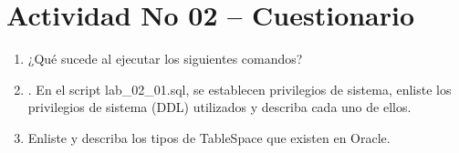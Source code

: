 \section{Actividad No 02 – Cuestionario} 

\begin{enumerate}[1.]
	\item ¿Qué sucede al ejecutar los siguientes comandos?

	\item . En el script lab\_02\_01.sql, se establecen privilegios de sistema, enliste los privilegios de sistema (DDL) utilizados y describa cada uno de ellos.
	
	\item Enliste y describa los tipos de TableSpace que existen en Oracle.
	
	

\end{enumerate} 
